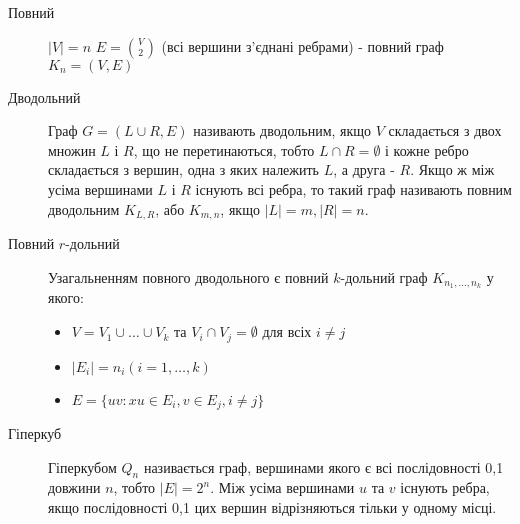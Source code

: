 \begin{description}
        \item[Повний] $\vert V \vert = n$ $E = {V \choose 2}$ (всі вершини з'єднані ребрами) - повний граф $K_n = (V,E)$
        \item[Дводольний] Граф $G = (L \cup R,E)$ називають дводольним, якщо $V$ складається з двох множин $L$ і $R$, що не перетинаються, тобто $L \cap R = \emptyset$ і кожне ребро складається з вершин, одна з яких належить $L$, а друга - $R$. Якщо ж між усіма вершинами $L$ і $R$ існують всі ребра, то такий граф називають повним дводольним $K_{L,R}$, або $K_{m,n}$, якщо $\vert L \vert = m, \vert R \vert = n$.
        \item[Повний $r$-дольний] Узагальненням повного дводольного є повний $k$-дольний граф $K_{n_1,\dots,n_k}$ у якого:
        \begin{itemize}     
        \item $V=V_1 \cup \dots \cup V_k$ та $V_i \cap V_j = \emptyset$ для всіх $i \ne j$
        \item $\vert E_i \vert = n_i (i=1,\dots,k)$
        \item $E = \lbrace uv : xu \in E_i, v \in E_j, i \ne j \rbrace$
        \end{itemize}
        \item[Гіперкуб] Гіперкубом $Q_n$ називається граф, вершинами якого є всі послідовності 0,1 довжини $n$, тобто $\vert E \vert = 2^n$. Між усіма вершинами $u$ та $v$ існують ребра, якщо послідовності 0,1 цих вершин відрізняються тільки у одному місці.
\end{description}

